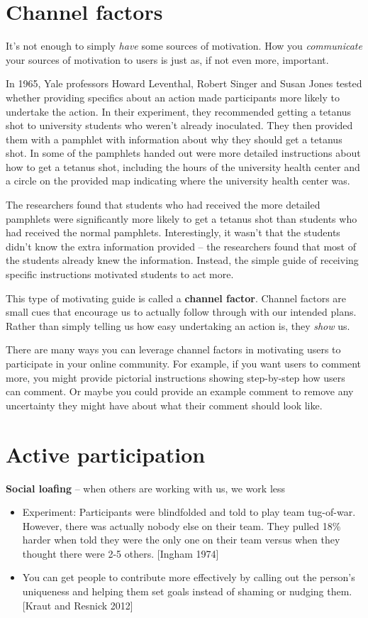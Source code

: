 \documentclass[class=book, crop=false]{standalone}
\providecommand{\keyterm}[1]{\textbf{#1}\marginnote{\scriptsize \textbf{#1}}}
\begin{document}
\section{Channel factors}

It's not enough to simply \textit{have} some sources of motivation. How you \textit{communicate} your sources of motivation to users is just as, if not even more, important.

In 1965, Yale professors Howard Leventhal, Robert Singer and Susan Jones tested whether providing specifics about an action made participants more likely to undertake the action. In their experiment, they recommended getting a tetanus shot to university students who weren't already inoculated. They then provided them with a pamphlet with information about why they should get a tetanus shot. In some of the pamphlets handed out were more detailed instructions about how to get a tetanus shot, including the hours of the university health center and a circle on the provided map indicating where the university health center was.

The researchers found that students who had received the more detailed pamphlets were significantly more likely to get a tetanus shot than students who had received the normal pamphlets. Interestingly, it wasn't that the students didn't know the extra information provided -- the researchers found that most of the students already knew the information. Instead, the simple guide of receiving specific instructions motivated students to act more.

This type of motivating guide is called a \keyterm{channel factor}. Channel factors are small cues that encourage us to actually follow through with our intended plans. Rather than simply telling us how easy undertaking an action is, they \textit{show} us.

There are many ways you can leverage channel factors in motivating users to participate in your online community. For example, if you want users to comment more, you might provide pictorial instructions showing step-by-step how users can comment. Or maybe you could provide an example comment to remove any uncertainty they might have about what their comment should look like.

\section{Active participation}

\keyterm{Social loafing} -- when others are working with us, we work less
\begin{itemize}
    \item Experiment: Participants were blindfolded and told to play team tug-of-war. However, there was actually nobody else on their team. They pulled 18\% harder when told they were the only one on their team versus when they thought there were 2-5 others. [Ingham 1974]
    \item You can get people to contribute more effectively by calling out the person’s uniqueness and helping them set goals instead of shaming or nudging them. [Kraut and Resnick 2012]
\end{itemize}
\end{document}
